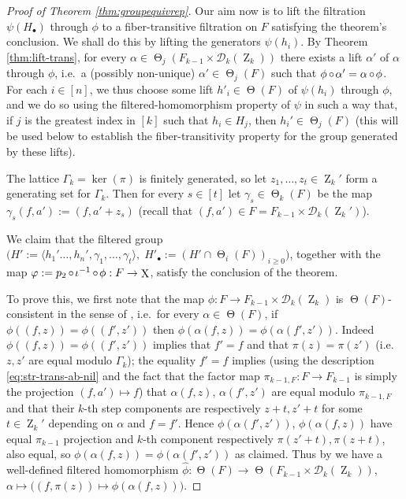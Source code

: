 \documentclass[a4paper,12pt,reqno]{amsart}
\theoremstyle{definition}
\def\to{\rightarrow}
\newcommand{\mc}{\mathcal}
\DeclareMathOperator{\ab}{Z}
\DeclareMathOperator{\tran}{\Theta}
\DeclareMathOperator{\ns}{X}
\DeclareMathOperator{\co}{\circ\hspace{-0.02 cm}}
\begin{document}
\begin{proof}[Proof of Theorem \ref{thm:groupequivrep}]
Our aim now is to lift the filtration $\psi(H_\bullet)$ through $\phi$ to a fiber-transitive filtration on $F$ satisfying the theorem's conclusion. We shall do this by lifting the generators $\psi(h_i)$. By Theorem \ref{thm:lift-trans}, for every $\alpha\in \tran_j(F_{k-1}\times \mc{D}_k(\ab_k))$ there exists a lift $\alpha'$ of $\alpha$ through $\phi$, i.e.\ a (possibly non-unique) $\alpha'\in \tran_j(F)$ such that $\phi\co \alpha' = \alpha\co\phi$. For each $i\in[n]$, we thus choose some lift $h'_i\in \tran(F)$ of $\psi(h_i)$ through $\phi$, and we do so using the filtered-homomorphism property of $\psi$ in such a way that, if $j$ is the greatest index in $[k]$ such that $h_i\in H_j$, then $h_i'\in \tran_j(F)$ (this will be used below to establish the fiber-transitivity property  for the group generated by these lifts).

The lattice $\Gamma_k=\ker(\pi)$ is finitely generated, so let $z_1,\ldots,z_t\in \ab_k'$ form a generating set for $\Gamma_k$. Then for every $s\in[t]$ let $\gamma_s\in \tran_k(F)$ be the map $\gamma_s(f,a'):=(f,a'+z_s)$  (recall that $(f,a')\in F=F_{k-1}\times \mc{D}_k(\ab_k')$). 


We claim that the filtered group $\big(H':=\langle h_1'\ldots,h_n',\gamma_1,\ldots,\gamma_t\rangle,\; H'_\bullet:=(H'\cap\tran_i(F))_{i\geq 0}\big)$, together with the map $\varphi:=p_2\co \iota^{-1}\co \phi: F\to \ns$, satisfy the conclusion of the theorem. 

To prove this, we first note that the map $\phi:F\to F_{k-1}\times \mc{D}_k(\ab_k)$ is $\tran(F)$-consistent in the sense of \cite[Definition 1.2]{CGSS}, i.e.\ for every $\alpha\in \tran(F)$, if $\phi((f,z))=\phi((f',z'))$ then $\phi(\alpha(f,z))=\phi(\alpha(f',z'))$. 
Indeed $\phi((f,z))=\phi((f',z'))$ implies that $f'=f$ and that $\pi(z)=\pi(z')$ (i.e.\ $z,z'$ are equal modulo $\Gamma_k$); the equality $f'=f$ implies (using the description \eqref{eq:str-trans-ab-nil} and the fact that the factor map $\pi_{k-1,F}:F\to F_{k-1}$ is simply the projection $(f,a')\mapsto f$) that  $\alpha(f,z)$, $\alpha(f',z')$ are equal modulo $\pi_{k-1,F}$ and that their $k$-th step components are respectively $z+t,z'+t$ for some $t\in \ab_k'$ depending on $\alpha$ and $f=f'$. Hence $\phi(\alpha(f',z'))$, $\phi(\alpha(f,z))$ have equal $\pi_{k-1}$ projection and $k$-th component respectively $\pi(z'+t),\pi(z+t)$, also equal, so $\phi(\alpha(f,z))=\phi(\alpha(f',z'))$ as claimed. Thus by \cite[Lemma 1.5]{CGSS} we have a well-defined filtered homomorphism $\widehat{\phi}:\tran(F)\to \tran(F_{k-1}\times \mc{D}_k(\ab_k))$, $\alpha\mapsto \big((f,\pi(z))\mapsto \phi (\alpha(f,z))\big)$.


\end{proof}
\end{document}
